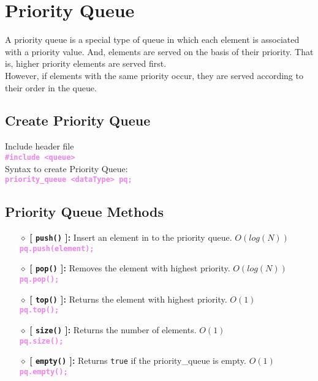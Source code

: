 \newpage
\section{Priority Queue}
A priority queue is a special type of queue in which each element is associated with a priority value. And, elements are served on the basis of their priority. That is, higher priority elements are served first.\\
However, if elements with the same priority occur, they are served according to their order in the queue.

\subsection{Create Priority Queue}
Include header file\\
\tab \tab \textbf{\textcolor{violet}{\texttt{\#include <queue>}}}\\
Syntax to create Priority Queue:\\
\tab \tab \textbf{\textcolor{violet}{\texttt{priority\_queue <dataType> pq;}}}

\subsection{Priority Queue Methods}
\begin{itemize}

	\item[{\LARGE $\diamond$}] \textbf{[ \texttt{push()} ]:} Insert an element in to the priority queue. $O(log(N))$\\
	\tab \textbf{\textcolor{violet}{\texttt{pq.push(element);}}}
	
	\item[{\LARGE $\diamond$}] \textbf{[ \texttt{pop()} ]:} Removes the element with highest priority. $O(log(N))$\\
	\tab \textbf{\textcolor{violet}{\texttt{pq.pop();}}}
	
	\item[{\LARGE $\diamond$}] \textbf{[ \texttt{top()} ]:} Returns the element with highest priority. $O(1)$\\
	\tab \textbf{\textcolor{violet}{\texttt{pq.top();}}}
	
	\item[{\LARGE $\diamond$}] \textbf{[ \texttt{size()} ]:} Returns the number of elements. $O(1)$\\
	\tab \textbf{\textcolor{violet}{\texttt{pq.size();}}}
	
	\item[{\LARGE $\diamond$}] \textbf{[ \texttt{empty()} ]:} Returns \texttt{true} if the   priority\_queue is empty. $O(1)$\\
	\tab \textbf{\textcolor{violet}{\texttt{pq.empty();}}}
	
\end{itemize}

